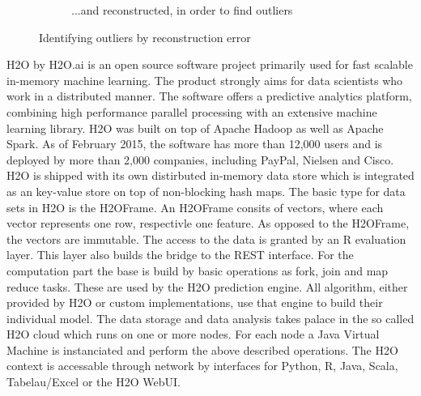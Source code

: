 \documentclass{vldb}
\begin{document}
\begin{figure}
\begin{subfigure}{\linewidth}
  \caption{...and reconstructed, in order to find outliers}
  \label{subfig:reduction-c}
\end{subfigure}
\caption{Identifying outliers by reconstruction error}
\label{fig:auto-encoder-reconstruction}
\end{figure}

H2O by H2O.ai is an open source software project primarily used for fast scalable in-memory machine learning. The product strongly aims for data scientists who work in a distributed manner. The software offers a predictive analytics platform, combining high performance parallel processing with an extensive machine learning library. \cite{website:h2o} H2O was built on top of Apache Hadoop as well as Apache Spark. As of February 2015, the software has more than 12,000 users and is deployed by more than 2,000 companies, including PayPal, Nielsen and Cisco. \cite{booklet:deep-learning}\\

H2O is shipped with its own distirbuted in-memory data store which is integrated as an key-value store on top of non-blocking hash maps. The basic type for data sets in H2O is the H2OFrame. An H2OFrame consits of vectors, where each vector represents one row, respectivle one feature. As opposed to the H2OFrame, the vectors are immutable. The access to the data is granted by an R evaluation layer. This layer also builds the bridge to the REST interface. For the computation part the base is build by basic operations as fork, join and map reduce tasks. These are used by the H2O prediction engine. All algorithm, either provided by H2O or custom implementations, use that engine to build their individual model. The data storage and data analysis takes palace in the so called H2O cloud which runs on one or more nodes. For each node a Java Virtual Machine is instanciated and perform the above described operations. The H2O context is accessable through network by interfaces for Python, R, Java, Scala, Tabelau/Excel or the H2O WebUI. \\
\end{document}
